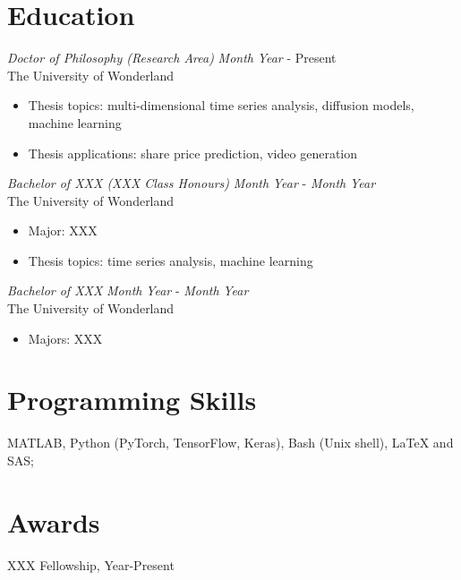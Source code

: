 \documentclass[margin, 11pt]{res} %
\begin{document}
\begin{resume}
\section{Education}
{\sl Doctor of Philosophy (\textit{Research Area})} \hfill \textit{Month} \textit{Year} - Present\\
The University of Wonderland
\begin{itemize}
    \item Thesis topics: multi-dimensional time series analysis, diffusion models, machine learning
    \item Thesis applications: share price prediction, video generation
\end{itemize}

{\sl Bachelor of XXX (XXX Class Honours)} \hfill \textit{Month} \textit{Year} - \textit{Month} \textit{Year}\\
The University of Wonderland
\begin{itemize}
\item Major: XXX
\item Thesis topics: time series analysis, machine learning
\end{itemize}


{\sl Bachelor of XXX} \hfill \textit{Month} \textit{Year} - \textit{Month} \textit{Year}\\
The University of Wonderland
\begin{itemize}
\item Majors: XXX
\end{itemize} 

\section{Programming Skills} 
MATLAB, Python (PyTorch, TensorFlow, Keras), Bash (Unix shell), LaTeX and SAS; \\

 
\section{Awards}
XXX Fellowship, Year-Present


\end{resume}
\end{document}

